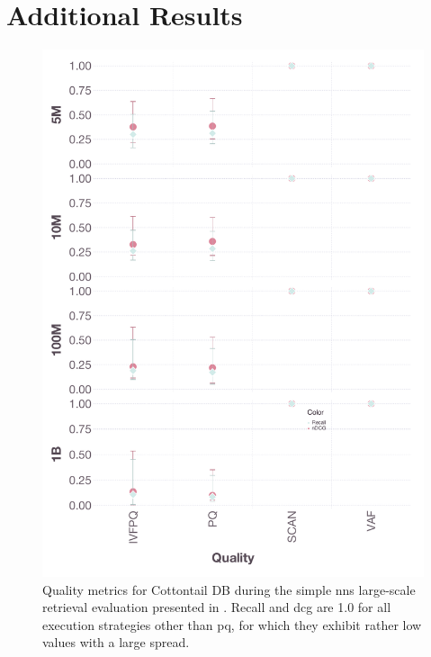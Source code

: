 \chapter{Additional Results}
\label{chapter:appendix_results}


\begin{figure}[bt]
    \includegraphics[width=\linewidth]{figures/bignns-cottontail-quality-NNS}
    \caption{Quality metrics for Cottontail DB during the simple \acrshort{nns} large-scale retrieval evaluation presented in . Recall and \acrshort{dcg} are 1.0 for all execution strategies other than \acrshort{pq}, for which they exhibit rather low values with a large spread.}
    \label{figure:appendix_bignns_cottontail_nns_quality}
\end{figure}

